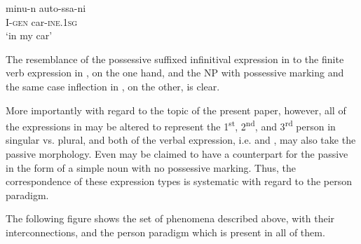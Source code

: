 \documentclass[output=paper, colorlinks,citecolor=brown]{langsci/langscibook}
\begin{document}
\ex \label{ex:leino:13c}
\gll minu-n  auto-ssa-ni\\
     I-\textsc{gen}    car-\textsc{ine.1sg}\\
\glt `in my car'
\z
\z

The resemblance of the possessive suffixed infinitival expression in  to the finite verb expression in , on the one hand, and the NP with possessive marking and the same case inflection in , on the other, is clear.

More importantly with regard to the topic of the present paper, however, all of the expressions in  may be altered to represent the 1\textsuperscript{st}, 2\textsuperscript{nd}, and 3\textsuperscript{rd} person in singular vs. plural, and both of the verbal expression, i.e.  and , may also take the passive morphology. Even  may be claimed to have a counterpart for the passive in the form of a simple noun with no possessive marking. Thus, the correspondence of these expression types is systematic with regard to the person paradigm.

The following figure shows the set of phenomena described above, with their interconnections, and the person paradigm which is present in all of them.
\end{document}
